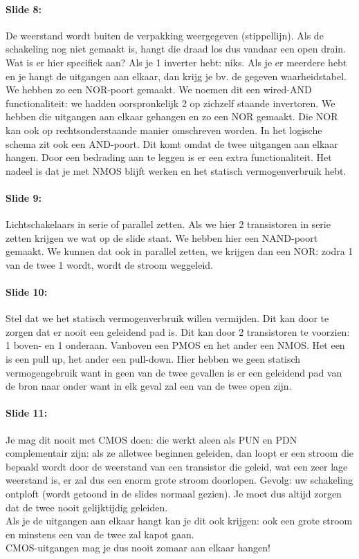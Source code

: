 \documentclass[10pt,a4paper]{book}
\begin{document}
\paragraph{Slide 8:} De weerstand wordt buiten de verpakking weergegeven (stippellijn). Als de schakeling nog niet gemaakt is, hangt die draad los dus vandaar een open drain. Wat is er hier specifiek aan? Als je 1 inverter hebt: niks. Als je er meerdere hebt en je hangt de uitgangen aan elkaar, dan krijg je bv. de gegeven waarheidstabel. We hebben zo een NOR-poort gemaakt. We noemen dit een wired-AND functionaliteit: we hadden oorspronkelijk 2 op zichzelf staande invertoren. We hebben die uitgangen aan elkaar gehangen en zo een NOR gemaakt. Die NOR kan ook op rechtsonderstaande manier omschreven worden. In het logische schema zit ook een AND-poort. Dit komt omdat de twee uitgangen aan elkaar hangen. Door een bedrading aan te leggen is er een extra functionaliteit. Het nadeel is dat je met NMOS blijft werken en het statisch vermogenverbruik hebt.

\paragraph{Slide 9:} Lichtschakelaars in serie of parallel zetten. Als we hier 2 transistoren in serie zetten krijgen we wat op de slide staat. We hebben hier een NAND-poort gemaakt. We kunnen dat ook in parallel zetten, we krijgen dan een NOR: zodra 1 van de twee 1 wordt, wordt de stroom weggeleid.

\paragraph{Slide 10:} Stel dat we het statisch vermogenverbruik willen vermijden. Dit kan door te zorgen dat er nooit een geleidend pad is. Dit kan door 2 transistoren te voorzien: 1 boven- en 1 onderaan. Vanboven een PMOS en het ander een NMOS. Het een is een pull up, het ander een pull-down. Hier hebben we geen statisch vermogengebruik want in geen van de twee gevallen is er een geleidend pad van de bron naar onder want in elk geval zal een van de twee open zijn.

\paragraph{Slide 11:} Je mag dit nooit met CMOS doen: die werkt aleen als PUN en PDN complementair zijn: als ze alletwee beginnen geleiden, dan loopt er een stroom die bepaald wordt door de weerstand van een transistor die geleid, wat een zeer lage weerstand is, er zal dus een enorm grote stroom doorlopen. Gevolg: uw schakeling ontploft (wordt getoond in de slides normaal gezien). Je moet dus altijd zorgen dat de twee nooit gelijktijdig geleiden.\\
Als je de uitgangen aan elkaar hangt kan je dit ook krijgen: ook een grote stroom en minstens een van de twee zal kapot gaan.\\ 
CMOS-uitgangen mag je dus nooit zomaar aan elkaar hangen! 
\end{document}
